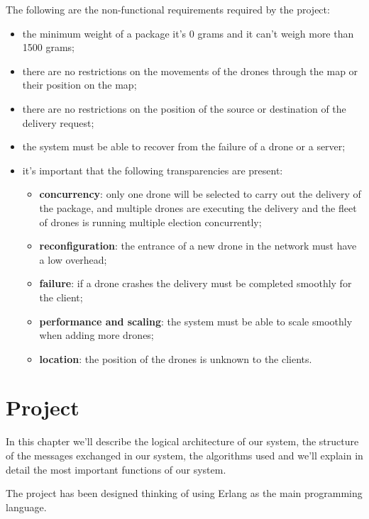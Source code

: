 \documentclass[a4paper, oneside]{memoir}
\begin{document}
The following are the non-functional requirements required by the project:
\begin{itemize}
\item the minimum weight of a package it's 0 grams and it can't weigh more than 1500 grams;
\item there are no restrictions on the movements of the drones through the map or their position on the map;
\item there are no restrictions on the position of the source or destination of the delivery request;
\item the system must be able to recover from the failure of a drone or a server;
\item it's important that the following transparencies are present:
	\begin{itemize}
	\item \textbf{concurrency}: only one drone will be selected to carry out the delivery of the package, and multiple drones are executing the delivery and the fleet of drones is running multiple election concurrently;
	\item \textbf{reconfiguration}: the entrance of a new drone in the network must have a low overhead;
	\item \textbf{failure}: if a drone crashes the delivery must be completed smoothly for the client;
	\item \textbf{performance and scaling}: the system must be able to scale smoothly when adding more drones;
	\item \textbf{location}: the position of the drones is unknown to the clients.
	\end{itemize}
\end{itemize}


\chapter{Project}
In this chapter we'll describe the logical architecture of our system, the structure of the messages exchanged in our system, the algorithms used and we'll explain in detail the most important functions of our system.

The project has been designed thinking of using Erlang as the main programming language.
\end{document}
